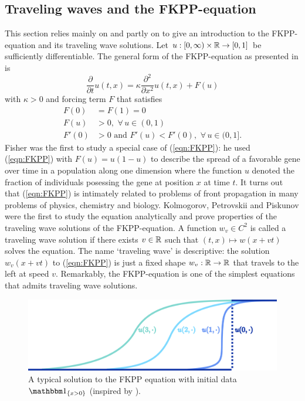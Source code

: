 \subsection{Traveling waves and the FKPP-equation}\label{subsec:FKPP}
This section relies mainly on \cite{FKPP_origin} and partly on \cite[Section 2]{brunet2015exactly} to give an introduction to the FKPP-equation and its traveling wave solutions. Let $u:[0, \infty) \times \mathbb{R} \to [0,1]$ be sufficiently differentiable. The general form of the FKPP-equation as presented in \cite{FKPP_origin} is 
\begin{equation}\label{eqn:FKPP}
\frac{\partial}{\partial t} u(t, x) = \kappa \frac{\partial^2}{\partial x^2} u(t, x) + F(u)
\end{equation}
with $\kappa > 0$ and forcing term $F$ that satisfies 
\begin{align}\label{eqn:fkpp_assumption}
F(0) &= F(1) = 0 \\
F(u) &> 0, \,\,\forall\,u \in (0,1) \\
F'(0) &> 0 \text{ and } F'(u) < F'(0),\,\,\forall\,u\in(0, 1]. 
\end{align} 
Fisher \cite{fisher1937wave} was the first to study a special case of (\ref{eqn:FKPP}): he used (\ref{eqn:FKPP}) with $F(u) = u (1 - u)$ to describe the spread of a favorable gene over time in a population along one dimension where the function $u$ denoted the fraction of individuals posessing the gene at position $x$ at time $t$. It turns out that (\ref{eqn:FKPP}) is intimately related to problems of front propagation in many problems of physics, chemistry and biology. Kolmogorov, Petrovskii and Piskunov \cite{FKPP_origin} were the first to study the equation analytically and prove properties of the traveling wave solutions of the FKPP-equation. A function $w_v \in C^2$ is called a traveling wave solution if there exists $v \in \mathbb{R}$ such that $(t,x) \mapsto w(x + v t)$ solves the equation. The name `traveling wave' is descriptive: the solution $w_v(x + vt)$ to (\ref{eqn:FKPP}) is just a fixed shape $w_v:\mathbb{R} \to \mathbb{R}$ that travels to the left at speed $v$. Remarkably, the FKPP-equation is one of the simplest equations that admits traveling wave solutions. \\

\begin{figure}[!h]
\centering
\includegraphics{graphics/waves_nonreflected}
\caption{A typical solution to the FKPP equation with initial data $\Ind_{\{ x > 0\}}$ (inspired by \cite{FKPP_origin}). }
\label{fig:waves}
\end{figure}



